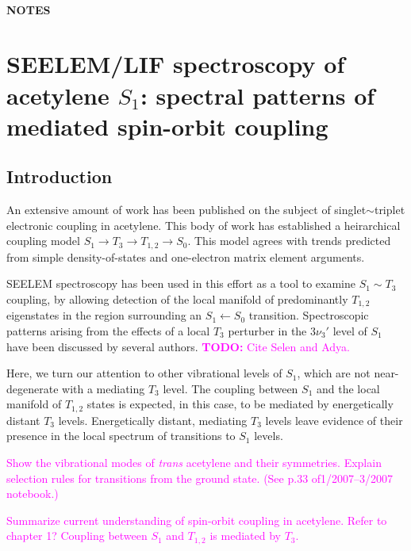 \documentclass[12pt,draft]{mitthesis}
\newcommand{\TODO} [1]{\textcolor{magenta}{\textbf{TODO:} #1}}
\newcommand{\POINT}[1]{\textcolor{magenta}{#1}}
\begin{document}
\tableofcontents
\clearpage

\subsubsection*{NOTES}

\clearpage

\chapter{SEELEM/LIF spectroscopy of 
  acetylene $S_1$: 
spectral patterns of mediated spin-orbit coupling
}

\section{Introduction}

An extensive amount of work has been published on the subject of
singlet$\sim$triplet electronic coupling in acetylene.  This body of
work has established a heirarchical coupling model $S_1 \rightarrow
T_3 \rightarrow T_{1,2} \rightarrow S_0$.  This model agrees with trends
predicted from simple density-of-states and one-electron matrix
element arguments.

SEELEM spectroscopy has been used in this effort as a tool to examine
$S_1 \sim T_3$ coupling, by allowing detection of the local manifold
of predominantly $T_{1,2}$ eigenstates in the region surrounding an
$S_1 \leftarrow S_0$ transition.  Spectroscopic patterns arising from
the effects of a local $T_3$ perturber in the $3 \nu_3'$ level of
$S_1$ have been discussed by several authors.  \TODO{Cite Selen and
  Adya.}

Here, we turn our attention to other vibrational levels of $S_1$,
which are not near-degenerate with a mediating $T_3$ level.  The
coupling between $S_1$ and the local manifold of $T_{1,2}$ states is
expected, in this case, to be mediated by energetically distant $T_3$
levels.  Energetically distant, mediating $T_3$ levels leave evidence
of their presence in the local spectrum of transitions to $S_1$
levels.

\POINT{Show the vibrational modes of \emph{trans} acetylene and their
  symmetries.  Explain selection rules for transitions from the ground
  state.  (See p.33 of1/2007--3/2007 notebook.)}

\POINT{Summarize current understanding of spin-orbit coupling in
  acetylene.  Refer to chapter 1?  Coupling between $S_1$ and
  $T_{1,2}$ is mediated by $T_3$.}
\end{document}
